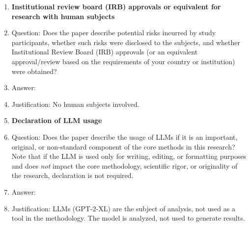 \begin{enumerate}
\item {\bf Institutional review board (IRB) approvals or equivalent for research with human subjects}
    \item[] Question: Does the paper describe potential risks incurred by study participants, whether such risks were disclosed to the subjects, and whether Institutional Review Board (IRB) approvals (or an equivalent approval/review based on the requirements of your country or institution) were obtained?
    \item[] Answer: \answerNA{}
    \item[] Justification: No human subjects involved.

\item {\bf Declaration of LLM usage}
    \item[] Question: Does the paper describe the usage of LLMs if it is an important, original, or non-standard component of the core methods in this research? Note that if the LLM is used only for writing, editing, or formatting purposes and does \emph{not} impact the core methodology, scientific rigor, or originality of the research, declaration is not required.
    \item[] Answer: \answerNA{}
    \item[] Justification: LLMs (GPT-2-XL) are the subject of analysis, not used as a tool in the methodology. The model is analyzed, not used to generate results.

\end{enumerate}
